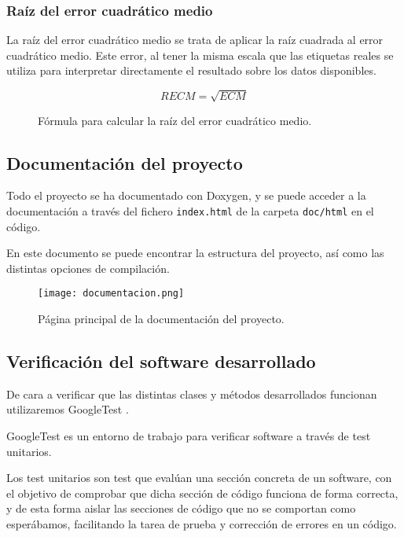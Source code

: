 \subsubsection{Raíz del error cuadrático medio}

La raíz del error cuadrático medio se trata de aplicar la raíz cuadrada al error cuadrático medio. Este error, al tener la misma escala que las etiquetas reales se utiliza para interpretar directamente el resultado sobre los datos disponibles.

\begin{figure}[H]
	 \centering
	 $$ RECM = \sqrt{ECM} $$
	 \caption{Fórmula para calcular la raíz del error cuadrático medio.}
	\label{fig:ECM}
\end{figure}

\newpage

\subsection{Documentación del proyecto}

Todo el proyecto se ha documentado con Doxygen, y se puede acceder a la documentación a través del fichero \texttt{index.html} de la carpeta \texttt{doc/html} en el código.

En este documento se puede encontrar la estructura del proyecto, así como las distintas opciones de compilación.

\begin{figure}[H]
	 \centering
	 \texttt{[image: documentacion.png]}
	 \caption{Página principal de la documentación del proyecto.}
	\label{fig:documentación}
\end{figure}

\newpage

\subsection{Verificación del software desarrollado}

De cara a verificar que las distintas clases y métodos desarrollados funcionan utilizaremos GoogleTest \cite{gtest}.

GoogleTest es un entorno de trabajo para verificar software a través de test unitarios.

Los test unitarios son test que evalúan una sección concreta de un software, con el objetivo de comprobar que dicha sección de código funciona de forma correcta, y de esta forma aislar las secciones de código que no se comportan como esperábamos, facilitando la tarea de prueba y corrección de errores en un código.

